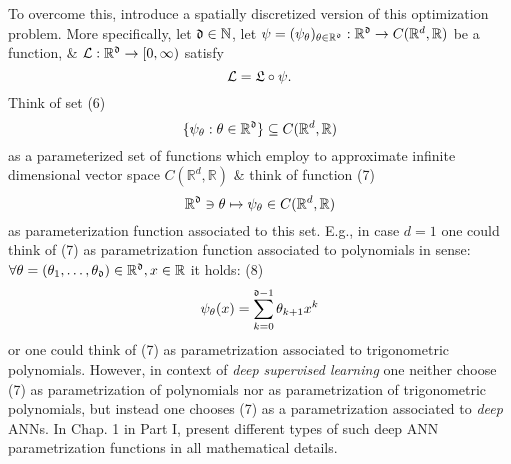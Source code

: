 \documentclass{article}
\begin{document}
To overcome this, introduce a spatially discretized version of this optimization problem. More specifically, let ${\frak d}\in\mathbb{N}$, let $\psi = (\psi_\theta)_{\theta\in\mathbb{R}^{\frak d}}:\mathbb{R}^{\frak d}\to C(\mathbb{R}^d,\mathbb{R})$ be a function, \& ${\cal L}:\mathbb{R}^{\frak d}\to[0,\infty)$ satisfy
\begin{equation}
	{\cal L} = {\frak L}\circ\psi.
\end{equation}
Think of set (6)
\begin{equation}
	\{\psi_\theta:\theta\in\mathbb{R}^{\frak d}\}\subseteq C(\mathbb{R}^d,\mathbb{R})
\end{equation}
as a parameterized set of functions which employ to approximate infinite dimensional vector space $C(\mathbb{R}^d,\mathbb{R})$ \& think of function (7)
\begin{equation}
	\mathbb{R}^{\frak d}\ni\theta\mapsto\psi_\theta\in C(\mathbb{R}^d,\mathbb{R})
\end{equation}
as parameterization function associated to this set. E.g., in case $d = 1$ one could think of (7) as parametrization function associated to polynomials in sense: $\forall\theta = (\theta_1,\ldots,\theta_{\frak d})\in\mathbb{R}^{\frak d},x\in\mathbb{R}$ it holds: (8)
\begin{equation}
	\psi_\theta(x) = \sum_{k=0}^{{\frak d} - 1} \theta_{k+1}x^k
\end{equation}
or one could think of (7) as parametrization associated to trigonometric polynomials. However, in context of {\it deep supervised learning} one neither choose (7) as parametrization of polynomials nor as parametrization of trigonometric polynomials, but instead one chooses (7) as a parametrization associated to {\it deep} ANNs. In Chap. 1 in Part I, present different types of such deep ANN parametrization functions in all mathematical details.
\end{document}
